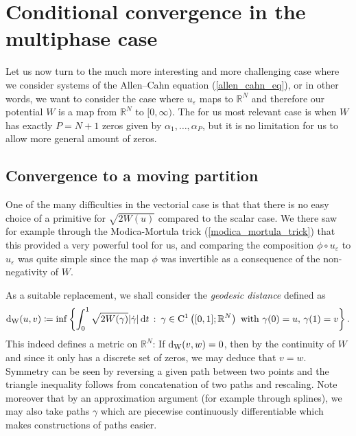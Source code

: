\section{Conditional convergence in the multiphase case}

Let us now turn to the much more interesting and more challenging case where we consider systems of the Allen--Cahn equation (\ref{allen_cahn_eq}), or in other words, we want to consider the case where $ u_{\varepsilon } $ maps to $ \mathbb{ R }^{ N } $ and therefore our potential $ W $ is a map from $ \mathbb{ R }^{ N } $ to $ [ 0 , \infty ) $. The for us most relevant case is when $ W $ has exactly $ P = N + 1 $ zeros given by $ \alpha_{ 1 } , \dotsc, \alpha_{ P } $, but it is no limitation for us to allow more general amount of zeros.

\subsection{Convergence to a moving partition}

One of the many difficulties in the vectorial case is that that there is no easy choice of a primitive for $ \sqrt{ 2 W ( u ) } $ compared to the scalar case. We there saw for example through the Modica-Mortula trick (\ref{modica_mortula_trick}) that this provided a very powerful tool for us, and comparing the composition $ \phi \circ u_{ \varepsilon } $ to $ u_{ \varepsilon } $ was quite simple since the map $ \phi $ was invertible as a consequence of the non-negativity of $ W $.

As a suitable replacement, we shall consider the \emph{geodesic distance} defined as 
\begin{equation*}
		\geodesic_distance ( u, v )
		\coloneqq
		\inf
		\left\{
		\int_{ 0 }^{ 1 }
		\sqrt{ 2 W ( \gamma ) }
		\abs{ \dot{ \gamma }  }
		\dd{t}
		\,
		\colon
		\, \gamma \in \mathrm{ C }^{ 1 } \left( [0, 1 ] ; \mathbb{ R }^{ N } \right) \text{ with } \gamma( 0 ) = u,\, \gamma( 1 )= v 
		\right\}.
\end{equation*}
This indeed defines a metric on $ \mathbb{ R }^{ N } $: If $ \geodesic_distance ( v, w ) = 0 $, then by the continuity of $ W $ and since it only has a discrete set of zeros, we may deduce that $ v = w $. Symmetry can be seen by reversing a given path between two points and the triangle inequality follows from concatenation of two paths and rescaling.
Note moreover that by an approximation argument (for example through splines), we may also take paths $ \gamma $ which are piecewise continuously differentiable which makes constructions of paths easier.

